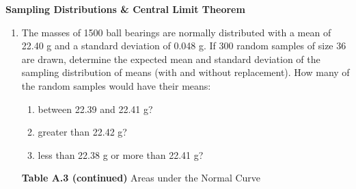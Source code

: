 \documentclass[12pt,a4paper]{article}
\newcommand{\subtopic}[2]{%
  \vspace{10pt}
  \noindent\begin{tcolorbox}[colback=#1!8,colframe=#1,boxrule=0.6pt,arc=4pt,
    left=6pt,right=6pt,top=4pt,bottom=4pt]
    \small\bfseries\textcolor{#1}{#2}
  \end{tcolorbox}
  \vspace{2pt}
}
\begin{document}
\subtopic{cG}{Sampling Distributions \& Central Limit Theorem}
\label{sub:s9-sampling}

\begin{enumerate}\item The masses of 1500 ball bearings are normally distributed with a mean of 22.40 g and a standard deviation of 0.048 g. If 300 random samples of size 36 are drawn, determine the expected mean and standard deviation of the sampling distribution of means (with and without replacement). How many of the random samples would have their means:
\begin{enumerate}
  \item between 22.39 and 22.41 g?
  \item greater than 22.42 g?
  \item less than 22.38 g or more than 22.41 g?
\end{enumerate}

\begin{center}
\end{center}

\vspace{0.3cm}
\noindent\textbf{Table A.3 (continued)} Areas under the Normal Curve
\vspace{0.2cm}


\end{enumerate}
\end{document}
